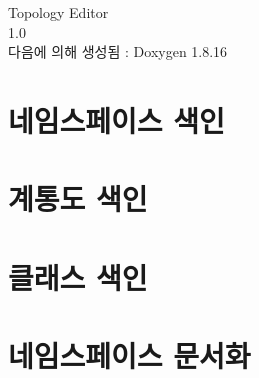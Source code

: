 \let\mypdfximage\pdfximage\def\pdfximage{\immediate\mypdfximage}\documentclass[twoside]{book}
\newcommand{\+}{\discretionary{\mbox{\scriptsize$\hookleftarrow$}}{}{}}
\newcommand{\clearemptydoublepage}{%
  \newpage{\pagestyle{empty}\cleardoublepage}%
}
\begin{document}
\hypersetup{pageanchor=false,
             bookmarksnumbered=true,
             pdfencoding=unicode
            }
\begin{titlepage}
\vspace*{7cm}
\begin{center}%
{\Large Topology Editor \\[1ex]\large 1.\+0 }\\
\vspace*{1cm}
{\large 다음에 의해 생성됨 \+:  Doxygen 1.8.16}\\
\end{center}
\end{titlepage}
\clearemptydoublepage
{}
\tableofcontents
\clearemptydoublepage
{}
\hypersetup{pageanchor=true}

\chapter{네임스페이스 색인}

\chapter{계통도 색인}

\chapter{클래스 색인}

\chapter{네임스페이스 문서화}









\end{document}
